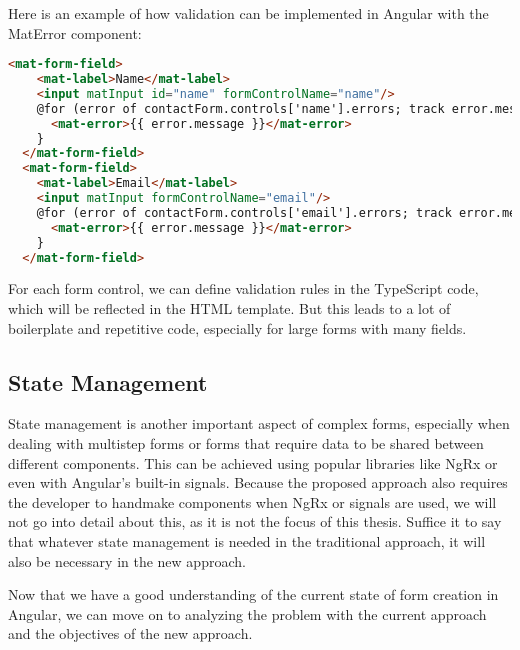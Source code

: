 Here is an example of how validation can be implemented in Angular with the MatError component:

\begin{lstlisting}[language=HTML,caption={Errors in HTML}, label={lst:errorsHTML}]
  <mat-form-field>
    <mat-label>Name</mat-label>
    <input matInput id="name" formControlName="name"/>
    @for (error of contactForm.controls['name'].errors; track error.message) {
      <mat-error>{{ error.message }}</mat-error>
    }
  </mat-form-field>
  <mat-form-field>
    <mat-label>Email</mat-label>
    <input matInput formControlName="email"/>
    @for (error of contactForm.controls['email'].errors; track error.message) {
      <mat-error>{{ error.message }}</mat-error>
    }
  </mat-form-field>
\end{lstlisting}

For each form control, we can define validation rules in the TypeScript code, which will be reflected in the HTML template.
But this leads to a lot of boilerplate and repetitive code, especially for large forms with many fields.

\subsection{State Management}

State management is another important aspect of complex forms, especially when dealing with multistep forms or forms
that require data to be shared between different components.
This can be achieved using popular libraries like NgRx or even with Angular's built-in signals.
Because the proposed approach also requires the developer to handmake components when NgRx or signals are used,
we will not go into detail about this, as it is not the focus of this thesis.
Suffice it to say that whatever state management is needed in the traditional approach, it will also be necessary in the
new approach.

Now that we have a good understanding of the current state of form creation in Angular, we can move on to analyzing the
problem with the current approach and the objectives of the new approach.